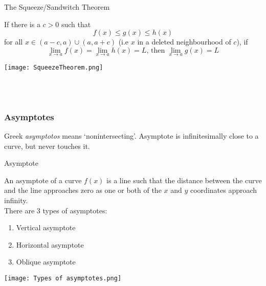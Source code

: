 \begin{theorem}{The Squeeze/Sandwitch Theorem}
   
    If there is a $c>0$ such that \[
        f(x)\le g(x)\le h(x)
    \] for all $x\in(a-c,a)\cup(a,a+c)$ (i.e $x$ in a deleted neighbourhood of $c$), if \[
        \lim_{x \to a} f(x) = \lim_{x \to a} h(x) = L \text{, then } \lim_{x \to a} g(x) = L
    \]
    \begin{center}
        \texttt{[image: SqueezeTheorem.png]}
    \end{center}
\end{theorem} \\~\\



\subsubsection{Asymptotes}
Greek \textit{asymptotos} means `nonintersecting'. Asymptote is infinitesimally close to a curve, but never touches it.

\begin{definition}{Asymptote}

    An asymptote of a curve $f(x)$ is a line such that the distance between the curve and the line approaches zero as one or both of the $x$ and $y$ coordinates approach infinity. \\
    There are 3 types of asymptotes:
    \begin{enumerate}
        \item Vertical asymptote
        \item Horizontal asymptote
        \item Oblique asymptote
    \end{enumerate}
\end{definition}

\begin{center}
    \texttt{[image: Types of asymptotes.png]}
\end{center}

